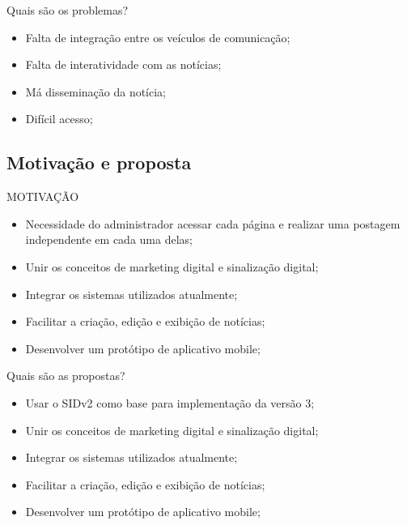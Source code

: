 \documentclass{aula-ifb}
\begin{document}
\begin{frame}{Quais são os problemas?}
\begin{itemize}
   \item Falta de integração entre os veículos de comunicação;
   \vspace{10px}
   \item Falta de interatividade com as notícias;
   \vspace{10px}
   \item Má disseminação da notícia;
   \vspace{10px}
   \item Difícil acesso;
\end{itemize}	 
\end{frame}

\subsection{Motivação e proposta}
\begin{frame}
MOTIVAÇÃO
\end{frame}

\begin{frame}
\begin{itemize}
   \item Necessidade do administrador acessar cada página e realizar uma postagem independente em cada uma delas;
   \vspace{10px}
   \item Unir os conceitos de marketing digital e sinalização digital;
   \vspace{10px}
   \item Integrar os sistemas utilizados atualmente;
   \vspace{10px}
   \item Facilitar a criação, edição e exibição de notícias;
   \vspace{10px}
   \item Desenvolver um protótipo de aplicativo mobile;
\end{itemize}

\end{frame}

\begin{frame}{Quais são as propostas?}
\begin{itemize}
   \item Usar o SIDv2 como base para implementação da versão 3;
   \vspace{10px}
   \item Unir os conceitos de marketing digital e sinalização digital;
   \vspace{10px}
   \item Integrar os sistemas utilizados atualmente;
   \vspace{10px}
   \item Facilitar a criação, edição e exibição de notícias;
   \vspace{10px}
   \item Desenvolver um protótipo de aplicativo mobile;
\end{itemize}
\end{frame}
\end{document}
